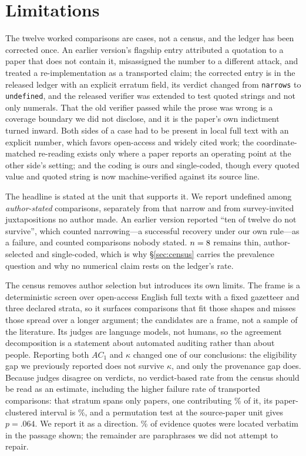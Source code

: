 \documentclass[11pt]{article}
\begin{document}
\section*{Limitations}

The twelve worked comparisons are cases, not a census, and the ledger has been
corrected once. An earlier version's flagship entry attributed a quotation to a
paper that does not contain it, misassigned the number to a different attack,
and treated a re-implementation as a transported claim; the corrected entry is
in the released ledger with an explicit erratum field, its verdict changed from
\texttt{narrows} to \texttt{undefined}, and the released verifier was extended
to test quoted strings and not only numerals. That the old verifier passed
while the prose was wrong is a coverage boundary we did not disclose, and it is
the paper's own indictment turned inward. Both sides of a case had to be
present in local full text with an explicit number, which favors open-access and
widely cited work; the coordinate-matched re-reading exists only where a paper
reports an operating point at the other side's setting; and the coding is ours
and single-coded, though every quoted value and quoted string is now
machine-verified against its source line.

The headline is stated at the unit that supports it. We report
\LedgerStatedUndef{} undefined among \LedgerStated{} \emph{author-stated}
comparisons, separately from \LedgerStatedNarrow{} that narrow and from
\LedgerInvited{} survey-invited juxtapositions no author made. An earlier
version reported ``ten of twelve do not survive'', which counted narrowing---a
successful recovery under our own rule---as a failure, and counted comparisons
nobody stated. $n=8{}$ remains thin, author-selected and
single-coded, which is why \S\ref{sec:census} carries the prevalence question
and why no numerical claim rests on the ledger's rate.

The census removes author selection but introduces its own limits. The frame is
a deterministic screen over open-access English full texts with a fixed
gazetteer and three declared strata, so it surfaces comparisons that fit those
shapes and misses those spread over a longer argument; the \FrameCandidates{}
candidates are a frame, not a sample of the literature. Its judges are language
models, not humans, so the agreement decomposition is a statement about
automated auditing rather than about people. Reporting both $AC_1$ and $\kappa$
changed one of our conclusions: the eligibility gap we previously reported does
not survive $\kappa$, and only the provenance gap does. Because judges disagree
on verdicts, no verdict-based rate from the census should be read as an
estimate, including the higher failure rate of transported comparisons: that
stratum spans only \ProvTransPapers{} papers, one contributing
\ProvTransLargest\% of it, its paper-clustered interval is \ProvTransFailCI\%,
and a permutation test at the source-paper unit gives $p=.064$. We report it as
a direction. \CensusQuoteRate\% of evidence quotes were located verbatim in the
passage shown; the remainder are paraphrases we did not attempt to repair.
\end{document}
